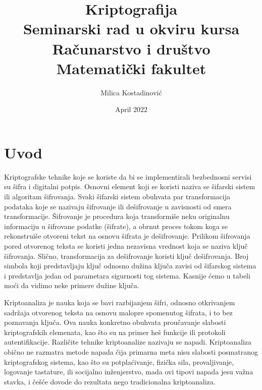 \documentclass[a4paper]{article}
\begin{document}
\title{Kriptografija \\ \small{Seminarski rad u okviru kursa \\ Računarstvo i društvo\\ Matematički fakultet}}
\author{Milica Kostadinović}
\date{April 2022}

\maketitle


\tableofcontents

\newpage

\section{Uvod}
\label{sec:uvod}
Kriptografske tehnike koje se koriste da bi se implementirali bezbednosni servisi su šifra i digitalni potpis. Osnovni element koji se koristi naziva se šifarski sistem ili algoritam
šifrovanja. Svaki šifarski sistem obuhvata par transformacija podataka koje se nazivaju šifrovanje ili dešifrovanje u zavisnosti od smera transformacije. Šifrovanje je procedura koja transformiše neku originalnu informaciju u šifrovane podatke (šifrate), a obrnut proces tokom koga se rekonstruiše otvoreni tekst na osnovu šifrata je dešifrovanje.
Prilikom šifrovanja pored otvorenog teksta se koristi jedna nezavisna vrednost koja se naziva ključ šifrovanja. Slično, transformacija za dešifrovanje koristi ključ dešifrovanja. Broj simbola koji predstavljaju ključ odnosno dužina ključa zavisi od šifarskog sistema i predstavlja jedan od parametara sigurnosti tog sistema. Kasnije ćemo u tabeli moći da vidimo neke
primere dužine ključa.

Kriptoanaliza \cite{Kriptoanaliza_wiki} je nauka koja se bavi razbijanjem šifri, odnosno otkrivanjem sadržaja otvorenog teksta na osnovu malopre spomenutog šifrata, i to bez poznavanja ključa. Ova nauka konkretno obuhvata proučavanje slabosti kriptografskih elemenata, kao što su na primer heš funkcije ili protokoli autentifikacije. Različite tehnike kriptoanalize nazivaju se napadi. Kriptoanaliza obično ne razmatra metode napada čija primarna meta nisu slabosti posmatranog kriptografskog sistema, kao što su potplaćivanje, fizička sila, provaljivanje, logovanje tastature, ili socijalno inženjerstvo, mada ovi tipovi napada jesu važna stavka, i češće dovode do rezultata nego tradicionalna kriptoanaliza.
\end{document}

